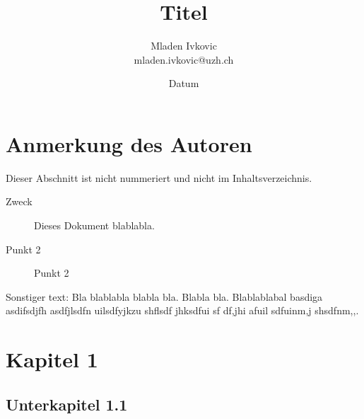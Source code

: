 \documentclass[12pt, a4paper, twopage]{scrartcl}
\title{Titel}
\author{Mladen Ivkovic\\
mladen.ivkovic@uzh.ch\\
}
\date{Datum}
\begin{document}
		
		
\nocite{*} %
		
		






\maketitle
\clearpage

\tableofcontents %
\clearpage







\section*{Anmerkung des Autoren}

Dieser Abschnitt ist nicht nummeriert und nicht im Inhaltsverzeichnis. 


\begin{description}
  \item[Zweck] Dieses Dokument blablabla.
  \item[Punkt 2] Punkt 2
\end{description}

Sonstiger text: Bla blablabla blabla bla. Blabla bla. Blablablabal basdiga asdifsdjfh asdfjlsdfn uilsdfyjkzu shflsdf jhksdfui sf df,jhi afuil sdfuinm,j shsdfnm,,.
\clearpage






















\section{Kapitel 1}
\subsection{Unterkapitel 1.1}
\end{document}
